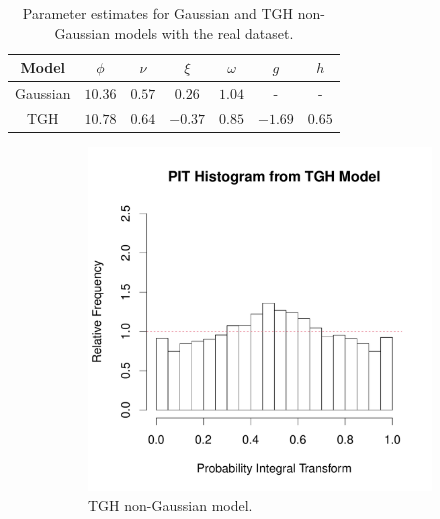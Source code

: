 \documentclass[conference]{IEEEtran}
\begin{document}
\begin{table}[htb]
\begin{center}
\begin{tabular}{ |c|c|c|c|c|c|c| } 
 \hline
 Model & $\phi$ & $\nu$ & $\xi$ & $\omega$& $g$ & $h$  \\
 \hline 
Gaussian & $10.36$ & $0.57$ & $0.26$ & $1.04$ & -  & -   \\
 \hline
 TGH & $10.78$ & $0.64$ & $-0.37$ & $0.85$ & $-1.69$ & $0.65$ \\
 \hline
 \end{tabular}
\end{center}
\caption{Parameter estimates for Gaussian and TGH non-Gaussian models with the real dataset.}
\label{table:estimates}
\end{table}
\begin{figure}[h]
\centering
\begin{subfigure}{.23\textwidth}
  \centering
  \includegraphics[width=\linewidth]{./figures/PIT_real_nongaussian.pdf}
   \caption{TGH non-Gaussian model.}
\end{subfigure}%
\begin{subfigure}{.23\textwidth}
  \centering

\end{subfigure}
\end{figure}
\end{document}
